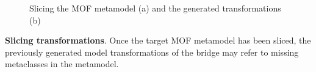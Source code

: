 \begin{figure}
  \centering
 \hspace{10mm}
  \caption{Slicing the MOF metamodel (a) and the generated transformations (b)}
  \label{fig:slicer}
\end{figure}
\vspace{-.5cm}
%
\textbf{Slicing transformations}.
Once the target MOF metamodel has been sliced, the
previously generated model transformations of the bridge may refer to missing metaclasses in the metamodel.
